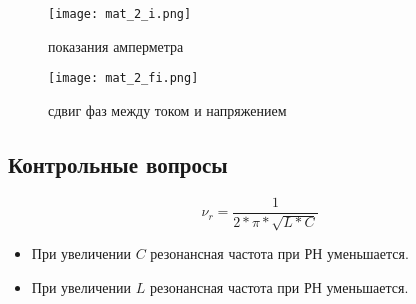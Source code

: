 \documentclass[a4paper,14pt]{article}
\begin{document}
\begin{figure}[H]
	\centering
	\texttt{[image: mat\_2\_i.png]}
	\caption{показания амперметра}	
\end{figure}


\begin{figure}[H]
	\centering
	\texttt{[image: mat\_2\_fi.png]}
	\caption{сдвиг фаз между током и напряжением}	
\end{figure}


\subsection{Контрольные вопросы}
$$\nu_r = \dfrac{1}{2*\pi * \sqrt{L*C}}$$
\begin{itemize}
	\item При увеличении $C$ резонансная частота при РН уменьшается.
	\item При увеличении $L$ резонансная частота при РН уменьшается.
\end{itemize}
\end{document}
